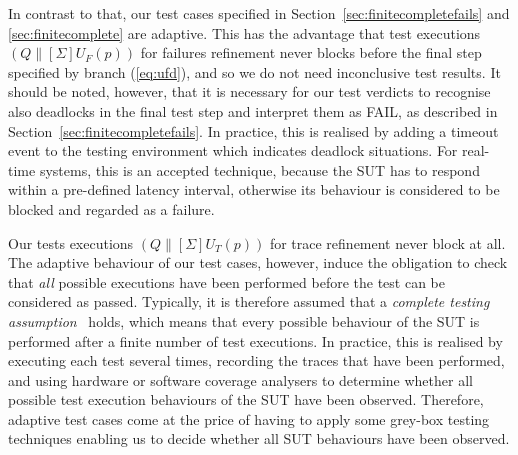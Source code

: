 In contrast to that, our test cases specified in
Section~\ref{sec:finitecompletefails} and \ref{sec:finitecomplete} are
adaptive. This has the advantage that test executions $(Q\parallel[\Sigma]
U_F(p))$ for failures refinement never blocks before the final step specified
by branch (\ref{eq:ufd}), and so we do not need inconclusive test results.
 It should be noted, however, that it is
necessary for our test verdicts to recognise also deadlocks in the final test
step and interpret them as FAIL, as described in
Section~\ref{sec:finitecompletefails}. In practice, this is realised by
adding a timeout event to the testing environment which indicates deadlock
situations. For real-time systems, this is an accepted technique, because the
SUT has to respond within a pre-defined latency interval, otherwise its
behaviour is considered to be blocked and regarded as a failure.

Our tests executions $(Q\parallel[\Sigma] U_T(p))$ for trace refinement never
block at all. The adaptive behaviour of our test cases, however, induce the
 obligation to check that {\it all} possible executions have been
performed before the test can be considered as passed. Typically, it is
therefore assumed that a \emph{complete testing
assumption}~\cite{hierons_testing_2004}  holds, which means that every possible
behaviour of the SUT is performed after a finite number of test executions.
In practice, this is realised by executing each test several times, recording
the traces that have been performed, and using hardware or software coverage
analysers to determine whether all possible test execution behaviours of the
SUT have been observed. Therefore, adaptive test cases come at the price of
having to apply some grey-box testing techniques enabling us to decide
whether all SUT behaviours have been observed.

